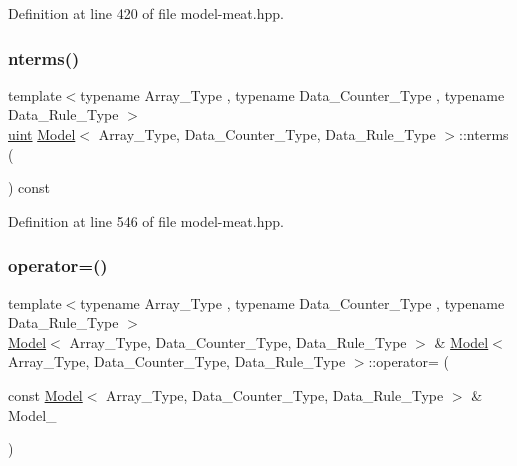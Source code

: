 Definition at line 420 of file model-\/meat.\+hpp.

\mbox{\label{class_model_ad2a8b05a7d53289a8fc2e315739acdf9}} 
\subsubsection{\texorpdfstring{nterms()}{nterms()}}
{\footnotesize\ttfamily template$<$typename Array\+\_\+\+Type , typename Data\+\_\+\+Counter\+\_\+\+Type , typename Data\+\_\+\+Rule\+\_\+\+Type $>$ \\
\hyperlink{typedefs_8hpp_a91ad9478d81a7aaf2593e8d9c3d06a14}{uint} \hyperlink{class_model}{Model}$<$ Array\+\_\+\+Type, Data\+\_\+\+Counter\+\_\+\+Type, Data\+\_\+\+Rule\+\_\+\+Type $>$\+::nterms (\begin{DoxyParamCaption}{ }\end{DoxyParamCaption}) const\hspace{0.3cm}{\ttfamily [inline]}}



Definition at line 546 of file model-\/meat.\+hpp.

\mbox{\label{class_model_a4944b5918dc4a9a59f72587da1e6bb3a}} 
\subsubsection{\texorpdfstring{operator=()}{operator=()}}
{\footnotesize\ttfamily template$<$typename Array\+\_\+\+Type , typename Data\+\_\+\+Counter\+\_\+\+Type , typename Data\+\_\+\+Rule\+\_\+\+Type $>$ \\
\hyperlink{class_model}{Model}$<$ Array\+\_\+\+Type, Data\+\_\+\+Counter\+\_\+\+Type, Data\+\_\+\+Rule\+\_\+\+Type $>$ \& \hyperlink{class_model}{Model}$<$ Array\+\_\+\+Type, Data\+\_\+\+Counter\+\_\+\+Type, Data\+\_\+\+Rule\+\_\+\+Type $>$\+::operator= (\begin{DoxyParamCaption}\item[{const \hyperlink{class_model}{Model}$<$ Array\+\_\+\+Type, Data\+\_\+\+Counter\+\_\+\+Type, Data\+\_\+\+Rule\+\_\+\+Type $>$ \&}]{Model\+\_\+ }\end{DoxyParamCaption})\hspace{0.3cm}{\ttfamily [inline]}}



